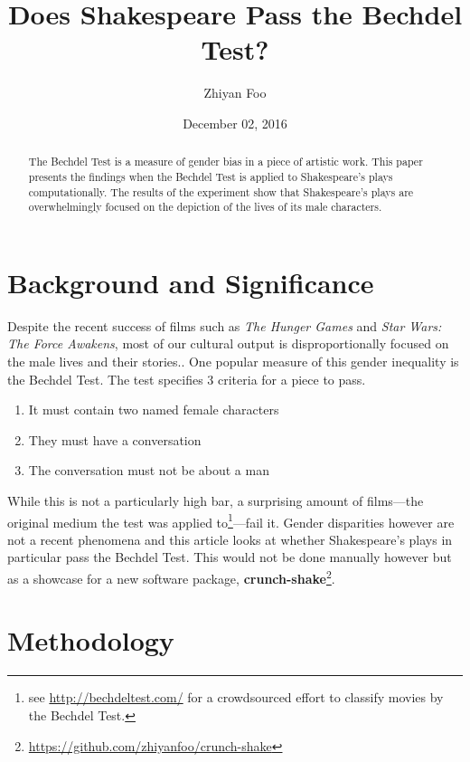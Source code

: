 \documentclass[12pt]{article}
\begin{document}
\title{Does Shakespeare Pass the Bechdel Test?}
\date{December 02, 2016}
\author{Zhiyan Foo}
\maketitle
\begin{abstract}
The Bechdel Test is a measure of gender bias in a piece of artistic work. This
    paper presents the findings when the Bechdel Test is applied to
    Shakespeare's plays computationally. The results of the experiment show
    that Shakespeare's plays are overwhelmingly focused on the depiction of the
lives of its male characters. \end{abstract}
\section{Background and Significance}
\label{sec:background_and_significance}

Despite the recent success of films such as \emph{The Hunger Games} and
\emph{Star Wars: The Force Awakens}, most of our cultural output is
disproportionally focused on the male lives and their stories.\cite{atlantic}. One popular
measure of this gender inequality is the Bechdel Test\cite{polygraph}. The test
specifies 3 criteria for a piece to pass. 
\begin{enumerate}  
\item It must contain two named female characters
\item They must have a conversation
\item The conversation must not be about a man
\end{enumerate}
While this is not a particularly high bar, a surprising amount of films---the
original medium the test was applied to\footnote{see
\url{http://bechdeltest.com/} for a crowdsourced effort to classify movies by
the Bechdel Test.}---fail it. Gender disparities however are not a recent
phenomena and this article looks at whether Shakespeare's plays in particular
pass the Bechdel Test. This would not be done manually however but as a
showcase for a new software package, \textbf{crunch-shake}\footnote{\url{https://github.com/zhiyanfoo/crunch-shake}}.

\section{Methodology}
\label{sec:methodology}
\end{document}
